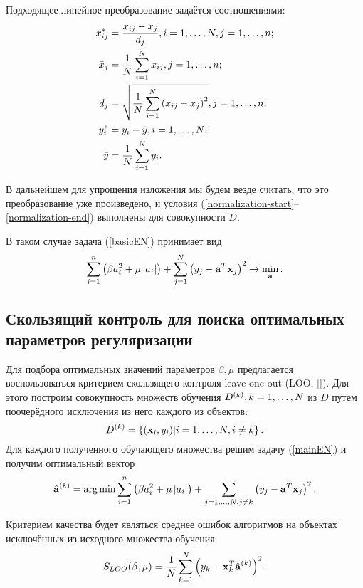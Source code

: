 Подходящее линейное преобразование задаётся соотношениями:
\begin{align*}
	x^*_{ij} 	&= \frac{x_{ij} - \bar x_j}{d_j}, i=1, \ldots, N, j=1, \ldots, n;\\
	\bar x_j 	&= \frac1N\sum\limits_{i=1}^N x_{ij}, j=1, \ldots, n;\\
	d_j 		&= \sqrt{\frac1N\sum\limits_{i=1}^N \left(x_{ij}-\bar x_j\right)^2}, j=1, \ldots, n;\\
	y^*_i 		&= y_i - \bar y, i=1, \ldots, N;\\
	\bar y 		&= \frac1N\sum\limits_{i=1}^N y_i. \\
\end{align*}

В дальнейшем для упрощения изложения мы будем везде считать, что это преобразование уже произведено, и условия (\ref{normalization-start}--\ref{normalization-end}) выполнены для совокупности $D.$

В таком случае задача (\ref{basicEN}) принимает вид
\begin{equation}
	\label{mainEN}
	\sum_{i=1}^n\left(\beta a_i^2 + \mu \left|a_i\right|\right) 
	+ \sum_{j=1}^N\left(y_j - \boldsymbol{\mathbf{a}}^T \boldsymbol{\mathbf{x}}_j\right)^2 
	\to \mathop{\mbox{min}}\limits_{\boldsymbol{\mathbf{a}}}.
\end{equation}

\subsection{Скользящий контроль для поиска оптимальных параметров регуляризации} %
\label{sub:intro:LOO}
Для подбора оптимальных значений параметров $\beta, \mu$ предлагается воспользоваться критерием скользящего контроля leave-one-out (LOO, []).
Для этого построим совокупность множеств обучения $D^{(k)}, k=1, \ldots, N$ из $D$ путем поочерёдного исключения из него каждого из объектов: 
\begin{equation}
	D^{(k)}=\left\{(\boldsymbol{\mathbf{x}}_i, y_i) | i=1, \ldots, N, i\ne k\right\}.
\end{equation}
Для каждого полученного обучающего множества решим задачу (\ref{mainEN}) и получим оптимальный вектор 
\begin{equation*}
	\hat{\boldsymbol{\mathbf{a}}}^{(k)} 
	= \mathop{\mbox{arg\ \!min}}\limits \sum\limits_{i=1}^n\left(\beta a_i^2 + \mu \left|a_i\right|\right) 
	+ \sum\limits_{j=1, \ldots, N, j\ne k}\left(y_j - \boldsymbol{\mathbf{a}}^T \boldsymbol{\mathbf{x}}_j\right)^2.
\end{equation*}

Критерием качества будет являться среднее ошибок алгоритмов на объектах исключённых из исходного множества обучения:
\begin{equation*}
	S_{LOO}(\beta, \mu) = \frac1N\sum\limits_{k=1}^N \left(y_k - \boldsymbol{\mathbf{x}}_k^T\hat{\boldsymbol{\mathbf{a}}}^{(k)}\right)^2.
\end{equation*}

